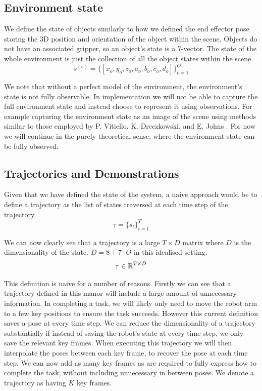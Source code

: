 \subsection{Environment state}
We define the state of objects similarly to how we defined the end effector pose storing the 3D position and orientation of the object within the scene. Objects do not have an associated gripper, so an object's state is a 7-vector. The state of the whole environment is just the collection of all the object states within the scene.
$$s^{(e)} = \{[x_o, y_o, z_o, a_o, b_o, c_o, d_o]\}_{o=1}^O$$

We note that without a perfect model of the environment, the environment's state is not fully observable. In implementation we will not be able to capture the full environment state and instead choose to represent it using observations. For example capturing the environment state as an image of the scene using methods similar to those employed by P. Vitiello, K. Dreczkowski, and E. Johns \cite{one-shot-pose-estimate}. For now we will continue in the purely theoretical sense, where the environment state can be fully observed.

\subsection{Trajectories and Demonstrations}
Given that we have defined the state of the system, a naive approach would be to define a trajectory as the list of states traversed at each time step of the trajectory.
$$\tau = \{s_t\}_{t=1}^T$$

We can now clearly see that a trajectory is a large $T \times D$ matrix where $D$ is the dimensionality of the state. $D = 8 + 7 \cdot O$ in this idealised setting.
$$\tau \in \operatorname{\mathbb{R}}^{T \times D}$$

This definition is naive for a number of reasons. Firstly we can see that a trajectory defined in this manor will include a large amount of unnecessary information. In completing a task, we will likely only need to move the robot arm to a few key positions to ensure the task succeeds. However this current definition saves a pose at every time step. We can reduce the dimensionality of a trajectory substantially if instead of saving the robot's state at every time step, we only save the relevant key frames. When executing this trajectory we will then interpolate the poses between each key frame, to recover the pose at each time step. We can now add as many key frames as are required to fully express how to complete the task, without including unnecessary in between poses. We denote a trajectory as having $K$ key frames.\\

